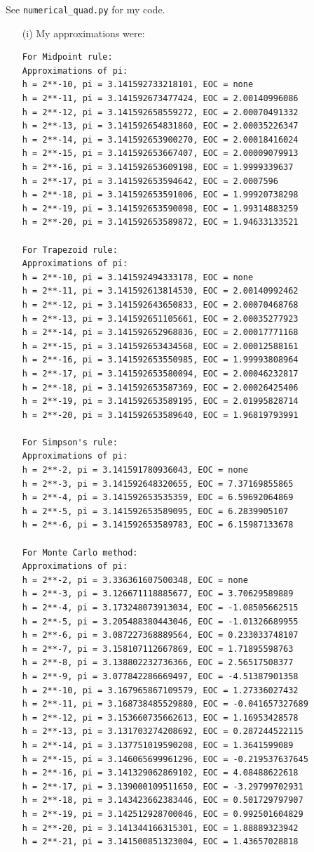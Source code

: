 \documentclass[10pt]{article}
\begin{document}

See \verb+numerical_quad.py+ for my code.

\begin{itemize}
\item[(i)] My approximations were: \begin{verbatim}
For Midpoint rule:
Approximations of pi:
h = 2**-10, pi = 3.141592733218101, EOC = none
h = 2**-11, pi = 3.141592673477424, EOC = 2.00140996086
h = 2**-12, pi = 3.141592658559272, EOC = 2.00070491332
h = 2**-13, pi = 3.141592654831860, EOC = 2.00035226347
h = 2**-14, pi = 3.141592653900270, EOC = 2.00018416024
h = 2**-15, pi = 3.141592653667407, EOC = 2.00009079913
h = 2**-16, pi = 3.141592653609198, EOC = 1.9999339637
h = 2**-17, pi = 3.141592653594642, EOC = 2.0007596
h = 2**-18, pi = 3.141592653591006, EOC = 1.99920738298
h = 2**-19, pi = 3.141592653590098, EOC = 1.99314883259
h = 2**-20, pi = 3.141592653589872, EOC = 1.94633133521

For Trapezoid rule:
Approximations of pi:
h = 2**-10, pi = 3.141592494333178, EOC = none
h = 2**-11, pi = 3.141592613814530, EOC = 2.00140992462
h = 2**-12, pi = 3.141592643650833, EOC = 2.00070468768
h = 2**-13, pi = 3.141592651105661, EOC = 2.00035277923
h = 2**-14, pi = 3.141592652968836, EOC = 2.00017771168
h = 2**-15, pi = 3.141592653434568, EOC = 2.00012588161
h = 2**-16, pi = 3.141592653550985, EOC = 1.99993808964
h = 2**-17, pi = 3.141592653580094, EOC = 2.00046232817
h = 2**-18, pi = 3.141592653587369, EOC = 2.00026425406
h = 2**-19, pi = 3.141592653589195, EOC = 2.01995828714
h = 2**-20, pi = 3.141592653589640, EOC = 1.96819793991

For Simpson's rule:
Approximations of pi:
h = 2**-2, pi = 3.141591780936043, EOC = none
h = 2**-3, pi = 3.141592648320655, EOC = 7.37169855865
h = 2**-4, pi = 3.141592653535359, EOC = 6.59692064869
h = 2**-5, pi = 3.141592653589095, EOC = 6.2839905107
h = 2**-6, pi = 3.141592653589783, EOC = 6.15987133678

For Monte Carlo method:
Approximations of pi:
h = 2**-2, pi = 3.336361607500348, EOC = none
h = 2**-3, pi = 3.126671118885677, EOC = 3.70629589889
h = 2**-4, pi = 3.173248073913034, EOC = -1.08505662515
h = 2**-5, pi = 3.205488380443046, EOC = -1.01326689955
h = 2**-6, pi = 3.087227368889564, EOC = 0.233033748107
h = 2**-7, pi = 3.158107112667869, EOC = 1.71895598763
h = 2**-8, pi = 3.138802232736366, EOC = 2.56517508377
h = 2**-9, pi = 3.077842286669497, EOC = -4.51387901358
h = 2**-10, pi = 3.167965867109579, EOC = 1.27336027432
h = 2**-11, pi = 3.168738485529880, EOC = -0.041657327689
h = 2**-12, pi = 3.153660735662613, EOC = 1.16953428578
h = 2**-13, pi = 3.131703274208692, EOC = 0.287244522115
h = 2**-14, pi = 3.137751019590208, EOC = 1.3641599089
h = 2**-15, pi = 3.146065699961296, EOC = -0.219537637645
h = 2**-16, pi = 3.141329062869102, EOC = 4.08488622618
h = 2**-17, pi = 3.139000109511650, EOC = -3.29799702931
h = 2**-18, pi = 3.143423662383446, EOC = 0.501729797907
h = 2**-19, pi = 3.142512928700046, EOC = 0.992501604829
h = 2**-20, pi = 3.141344166315301, EOC = 1.88889323942
h = 2**-21, pi = 3.141500851323004, EOC = 1.43657028818
\end{verbatim}


\end{itemize}
\end{document}
